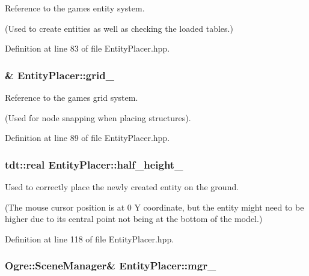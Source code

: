 Reference to the game\textquotesingle{}s entity system. 

(Used to create entities as well as checking the loaded tables.) 

Definition at line 83 of file Entity\+Placer.\+hpp.

\subsubsection[{\texorpdfstring{grid\+\_\+}{grid_}}]{\& Entity\+Placer\+::grid\+\_\+\hspace{0.3cm}{\ttfamily [private]}}\hypertarget{class_entity_placer_ab83d8094255391c2ad998dad77420510}{}\label{class_entity_placer_ab83d8094255391c2ad998dad77420510}


Reference to the game\textquotesingle{}s grid system. 

(Used for node snapping when placing structures). 

Definition at line 89 of file Entity\+Placer.\+hpp.

\subsubsection[{\texorpdfstring{half\+\_\+height\+\_\+}{half_height_}}]{\setlength{\rightskip}{0pt plus 5cm}tdt\+::real Entity\+Placer\+::half\+\_\+height\+\_\+\hspace{0.3cm}{\ttfamily [private]}}\hypertarget{class_entity_placer_a72d45d5edaff74b58a898a7ad1b518fc}{}\label{class_entity_placer_a72d45d5edaff74b58a898a7ad1b518fc}


Used to correctly place the newly created entity on the ground. 

(The mouse cursor position is at 0 Y coordinate, but the entity might need to be higher due to it\textquotesingle{}s central point not being at the bottom of the model.) 

Definition at line 118 of file Entity\+Placer.\+hpp.

\subsubsection[{\texorpdfstring{mgr\+\_\+}{mgr_}}]{\setlength{\rightskip}{0pt plus 5cm}Ogre\+::\+Scene\+Manager\& Entity\+Placer\+::mgr\+\_\+\hspace{0.3cm}{\ttfamily [private]}}\hypertarget{class_entity_placer_ad80a74a9b6ee426c6050b825d3c78aea}{}\label{class_entity_placer_ad80a74a9b6ee426c6050b825d3c78aea}


